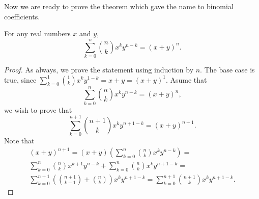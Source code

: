 Now we are ready to prove the theorem which gave the name to binomial
coefficients.
\begin{theorem}
  For any real numbers $x$ and $y$,
    \[
      \sum\limits_{k = 0}^n \binom{n}{k} x^k y^{n - k} = (x + y)^n.
    \]
\end{theorem}
\begin{proof}
  As always, we prove the statement using induction by $n$. The base case is
  true, since $\sum\limits_{k = 0}^1 \binom{1}{k} x^k y^{1 - k} = x + y =
  (x + y)^1$. Asume that
  \[
    \sum\limits_{k = 0}^n \binom{n}{k} x^k y^{n - k} = (x + y)^n,
  \]
  we wish to prove that
  \[
    \sum\limits_{k = 0}^{n + 1} \binom{n + 1}{k} x^k y^{n + 1 - k} =
      (x + y)^{n + 1}.
  \]
  Note that
  \begin{multline*}
    (x + y)^{n + 1} = (x + y)
      \left(
        \sum\limits_{k = 0}^n \binom{n}{k} x^k y^{n - k}
      \right) = \\
    \sum\limits_{k = 0}^n \binom{n}{k} x^{k + 1} y^{n - k} +
      \sum\limits_{k = 0}^n \binom{n}{k} x^{k} y^{n + 1 - k} = \\
    \sum\limits_{k = 0}^{n + 1}
      \left(
        \binom{n + 1}{k - 1} + \binom{n}{k}
      \right)
      x^k y^{n + 1 - k} =
    \sum\limits_{k = 0}^{n + 1} \binom{n + 1}{k} x^k y^{n + 1 - k}.
  \end{multline*}
\end{proof}
